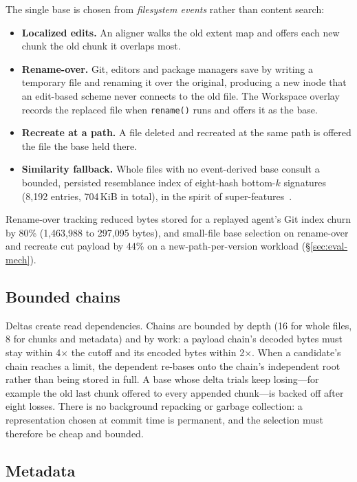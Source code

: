 \documentclass[letterpaper,twocolumn,10pt]{article}
\newcommand{\ws}{Workspace}
\newcommand{\X}{$\times$}
\begin{document}
The single base is chosen from \emph{filesystem events} rather than content
search:
\begin{itemize}
\item \textbf{Localized edits.} An aligner walks the old extent map and
  offers each new chunk the old chunk it overlaps most.
\item \textbf{Rename-over.} Git, editors and package managers save by
  writing a temporary file and renaming it over the original, producing a
  new inode that an edit-based scheme never connects to the old file. The
  \ws{} overlay records the replaced file when \texttt{rename()} runs and
  offers it as the base.
\item \textbf{Recreate at a path.} A file deleted and recreated at the same
  path is offered the file the base held there.
\item \textbf{Similarity fallback.} Whole files with no event-derived base
  consult a bounded, persisted resemblance index of eight-hash bottom-$k$
  signatures (8,192 entries, 704\,KiB in total), in the spirit of
  super-features~\cite{shilane,finesse}.
\end{itemize}
Rename-over tracking reduced bytes stored for a replayed agent's Git index
churn by 80\% (1,463,988 to 297,095 bytes), and small-file base selection on
rename-over and recreate cut payload by 44\% on a new-path-per-version
workload (\S\ref{sec:eval-mech}).

\subsection{Bounded chains}

Deltas create read dependencies. Chains are bounded by depth (16 for whole
files, 8 for chunks and metadata) and by work: a payload chain's decoded
bytes must stay within 4\X{} the cutoff and its encoded bytes within
2\X{}. When a candidate's chain reaches a limit, the dependent re-bases
onto the chain's independent root rather than being stored in full. A base
whose delta trials keep losing---for example the old last chunk offered to
every appended chunk---is backed off after eight losses. There is no
background repacking or garbage collection: a representation chosen at
commit time is permanent, and the selection must therefore be cheap and
bounded.

\subsection{Metadata}
\end{document}
